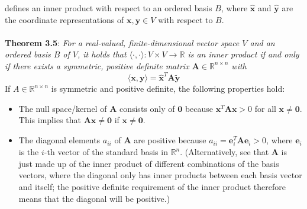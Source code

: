 \documentclass{report}
\begin{document}
defines an inner product with respect to an ordered basis $B$, where $\hat{\bm{x}}$ and $\hat{\bm{y}}$ are 
the coordinate representations of $\bm{x},\bm{y}\in V$ with respect to $B$.\\
\vspace{1mm}\\
\textbf{Theorem 3.5}: \textit{For a real-valued, finite-dimensional vector space $V$ and an ordered
basis $B$ of $V$, it holds that $\langle\cdot,\cdot\rangle:V\times V\to\mathbb{R}$ is an inner product if and
only if there exists a symmetric, positive definite matrix $\bm{A}\in\mathbb{R}^{n\times n}$ with}
\begin{equation*}
\langle\bm{x},\bm{y}\rangle=\hat{\bm{x}}^T\bm{A}\tilde{\bm{y}}
\end{equation*}
If $A\in\mathbb{R}^{n\times n}$ is symmetric and positive definite, the following properties hold:
\begin{itemize}
\item The null space/kernel of $\bm{A}$ consists only of $\bm{0}$ because $\bm{x}^T\bm{Ax}>0$ for all
$\bm{x}\neq\bm{0}$. This implies that $\bm{Ax}\neq\bm{0}$ if $\bm{x}\neq\bm{0}$.
\item The diagonal elements $a_{ii}$ of $\bm{A}$ are positive because $a_{ii}=\bm{e}_i^T\bm{A}\bm{e}_i>0$,
where $\bm{e}_i$ is the $i$-th vector of the standard basis in $\mathbb{R}^n$. (Alternatively, see that $\bm{A}$
is just made up of the inner product of different combinations of the basis vectors, where the diagonal only has
inner products between each basis vector and itself; the positive definite requirement of the inner product
therefore means that the diagonal will be positive.)
\end{itemize}
\newpage
\end{document}
